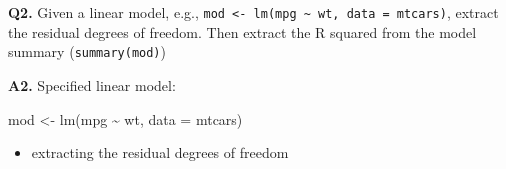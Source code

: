 \documentclass[
]{book}
\newenvironment{Shaded}{\begin{snugshade}}{\end{snugshade}}
\newcommand{\AttributeTok}[1]{\textcolor[rgb]{0.77,0.63,0.00}{#1}}
\newcommand{\CommentTok}[1]{\textcolor[rgb]{0.56,0.35,0.01}{\textit{#1}}}
\newcommand{\DecValTok}[1]{\textcolor[rgb]{0.00,0.00,0.81}{#1}}
\newcommand{\FunctionTok}[1]{\textcolor[rgb]{0.00,0.00,0.00}{#1}}
\newcommand{\NormalTok}[1]{#1}
\newcommand{\OtherTok}[1]{\textcolor[rgb]{0.56,0.35,0.01}{#1}}
\newcommand{\SpecialCharTok}[1]{\textcolor[rgb]{0.00,0.00,0.00}{#1}}
\newcommand{\StringTok}[1]{\textcolor[rgb]{0.31,0.60,0.02}{#1}}
\providecommand{\tightlist}{%
  \setlength{\itemsep}{0pt}\setlength{\parskip}{0pt}}
\begin{document}
\begin{Shaded}
\end{Shaded}

\textbf{Q2.} Given a linear model, e.g., \texttt{mod\ \textless{}-\ lm(mpg\ \textasciitilde{}\ wt,\ data\ =\ mtcars)}, extract the residual degrees of freedom. Then extract the R squared from the model summary (\texttt{summary(mod)})

\textbf{A2.} Specified linear model:

\begin{Shaded}
\begin{Highlighting}[]
\NormalTok{mod }\OtherTok{\textless{}{-}} \FunctionTok{lm}\NormalTok{(mpg }\SpecialCharTok{\textasciitilde{}}\NormalTok{ wt, }\AttributeTok{data =}\NormalTok{ mtcars)}
\end{Highlighting}
\end{Shaded}

\begin{itemize}
\tightlist
\item
  extracting the residual degrees of freedom
\end{itemize}

\begin{Shaded}
\end{Shaded}
\end{document}
